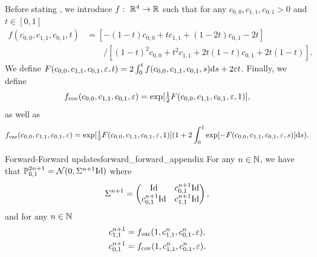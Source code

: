 \documentclass{article}
\begin{document}
Before stating , we introduce $f: \ \mathbb{R}^4 \to \mathbb{R}$ such that for any $c_{0,0}, c_{1,1}, c_{0,1} > 0$ and $t \in [0,1]$
\begin{align}
    f(c_{0,0}, c_{1,1}, c_{0,1}, t) &= [-(1-t)c_{0,0} + t c_{1,1} + (1-2t) c_{0,1}  - 2t] \\
    & \qquad / [(1-t)^2 c_{0,0} + t^2 c_{1,1} + 2t(1-t) c_{0,1} + 2t(1-t)] .
\end{align}
We define $F(c_{0,0}, c_{1,1}, c_{0,1}, \varepsilon, t) = 2 \int_0^t f(c_{0,0}, c_{1,1}, c_{0,1}, s) \mathrm{d} s + 2 \varepsilon t$.
Finally, we define 
\begin{equation}
    f_{\mathrm{cov}}(c_{0,0}, c_{1,1}, c_{0,1}, \varepsilon) = \exp[\tfrac{1}{2} F(c_{0,0}, c_{1,1}, c_{0,1}, \varepsilon, 1)] ,
\end{equation}
as well as 
\begin{equation}
    f_{\mathrm{var}}(c_{0,0}, c_{1,1}, c_{0,1}, \varepsilon) = \exp[\tfrac{1}{2} F(c_{0,0}, c_{1,1}, c_{0,1}, \varepsilon, 1)] (1 + 2 \int_0^1 \exp[-F(c_{0,0}, c_{1,1}, c_{0,1}, \varepsilon, s)] \mathrm{d} s) .
\end{equation}

\begin{proposition}{Forward-Forward updates}{forward_forward_appendix}
For any $n \in \mathbb{N}$, we have that $\mathbb{P}^{2n+1}_{0,1} = \mathcal{N}(0, \Sigma^{n+1} \mathrm{Id})$ where 
\begin{equation}
    \Sigma^{n+1} = \left( \begin{matrix} \mathrm{Id} & c_{0,1}^{n+1} \mathrm{Id} \\
    c_{0,1}^{n+1} \mathrm{Id} & c_{1,1}^{n+1} \mathrm{Id} \end{matrix} \right ) , 
\end{equation}
and for any $n \in \mathbb{N}$
\begin{align}
    &c_{1,1}^{n+1} = f_{\mathrm{var}}(1, c_{1,1}^n, c_{0,1}^n, \varepsilon) , \\
    &c_{0,1}^{n+1} = f_{\mathrm{cov}}(1, c_{1,1}^n, c_{0,1}^n, \varepsilon) . 
\end{align}
\end{proposition}
\end{document}
